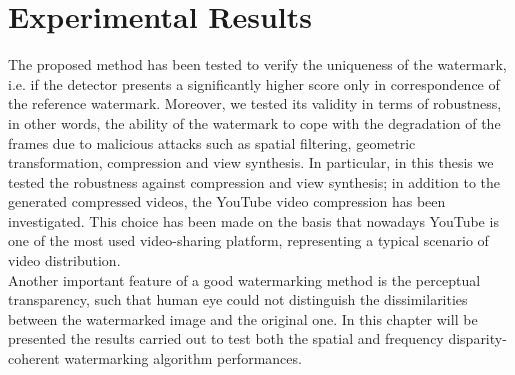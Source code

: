 \chapter{Experimental Results}
\label{exp}

The proposed method has been tested to verify the uniqueness of the watermark, i.e. if the detector presents a significantly higher score only in correspondence of the reference watermark. Moreover, we tested its validity in terms of robustness, in other words, the ability of the watermark to cope with the degradation of the frames due to malicious attacks such as spatial filtering, geometric transformation, compression and view synthesis. \newline 
In particular, in this thesis we tested the robustness against compression and view synthesis; in addition to the generated compressed videos, the YouTube video compression has been investigated. This choice has been made on the basis that nowadays YouTube is one of the most used video-sharing platform, representing a typical scenario of video distribution.\\
Another important feature of a good watermarking method is the perceptual transparency, such that human eye could not distinguish the dissimilarities between the watermarked image and the original one.\newline
In this chapter will be presented the results carried out to test both the spatial and frequency disparity-coherent watermarking algorithm performances.\newline

